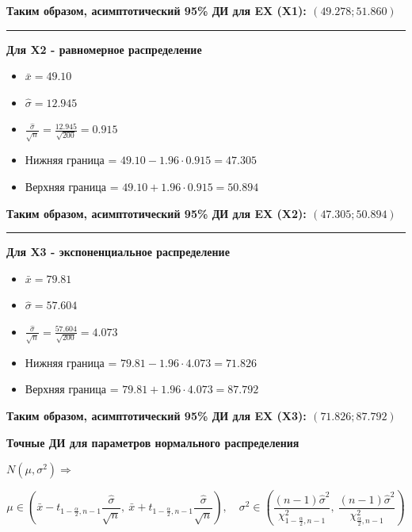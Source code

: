 \documentclass[11pt]{article}
\providecommand{\tightlist}{%
      \setlength{\itemsep}{0pt}\setlength{\parskip}{0pt}}
\begin{document}
\textbf{Таким образом, асимптотический 95\% ДИ для EX (X1):
\((49.278; 51.860)\)}

\begin{center}\rule{0.5\linewidth}{0.5pt}\end{center}

\textbf{Для X2 - равномерное распределение}

\begin{itemize}
\tightlist
\item
  \(\bar{x} = 49.10\)
\item
  \(\hat{\sigma} = 12.945\)
\item
  \(\frac{\hat{\sigma}}{\sqrt{n}} = \frac{12.945}{\sqrt{200}} = 0.915\)
\item
  Нижняя граница = \(49.10 - 1.96 \cdot 0.915 = 47.305\)
\item
  Верхняя граница = \(49.10 + 1.96 \cdot 0.915 = 50.894\)
\end{itemize}

\textbf{Таким образом, асимптотический 95\% ДИ для EX (X2):
\((47.305; 50.894)\)}

\begin{center}\rule{0.5\linewidth}{0.5pt}\end{center}

\textbf{Для X3 - экспоненциальное распределение}

\begin{itemize}
\tightlist
\item
  \(\bar{x} = 79.81\)
\item
  \(\hat{\sigma} = 57.604\)
\item
  \(\frac{\hat{\sigma}}{\sqrt{n}} = \frac{57.604}{\sqrt{200}} = 4.073\)
\item
  Нижняя граница = \(79.81 - 1.96 \cdot 4.073 = 71.826\)
\item
  Верхняя граница = \(79.81 + 1.96 \cdot 4.073 = 87.792\)
\end{itemize}

\textbf{Таким образом, асимптотический 95\% ДИ для EX (X3):
\((71.826; 87.792)\)}

    \textbf{Точные ДИ для параметров нормального распределения}

\(N(\mu, \sigma^2) \Rightarrow\)

\[
\mu \in \left(\bar{x} - t_{1 - \frac{\alpha}{2}, n - 1}\frac{\hat{\sigma}}{\sqrt{n}}, \ \bar{x} + t_{1 - \frac{\alpha}{2}, n - 1}\frac{\hat{\sigma}}{\sqrt{n}}\right),
\quad
\sigma^2 \in \left(\frac{(n-1)\hat{\sigma}^2}{\chi^2_{1 - \frac{\alpha}{2}, n - 1}}, \ \frac{(n-1)\hat{\sigma}^2}{\chi^2_{\frac{\alpha}{2}, n - 1}}\right)
\]
\end{document}
